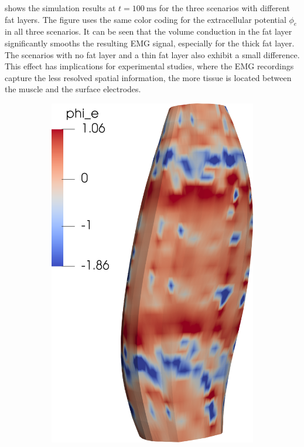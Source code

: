  shows the simulation results at $t=\SI{100}{\milli\second}$ for the three scenarios with different fat layers. The figure uses the same color coding for the extracellular potential $\phi_e$ in all three scenarios. It can be seen that the volume conduction in the fat layer significantly smooths the resulting EMG signal, especially for the thick fat layer. The scenarios with no fat layer and a thin fat layer also exhibit a small difference.
This effect has implications for experimental studies, where the EMG recordings capture the less resolved spatial information, the more tissue is located between the muscle and the surface electrodes.

\begin{figure}[H]
  \centering%
  \begin{subfigure}[t]{0.36\textwidth}%
    \centering%
    \includegraphics[width=\textwidth]{images/results/application/fibers_emg_no_fat.png}%

\end{subfigure}
\end{figure}
